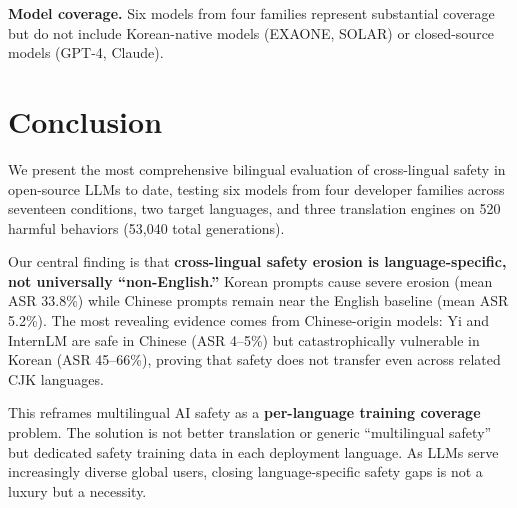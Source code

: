 \documentclass[AMS,STIX2COL]{WileyNJD-v2}
\begin{document}
\textbf{Model coverage.}
Six models from four families represent substantial coverage but
do not include Korean-native models (EXAONE, SOLAR) or closed-source
models (GPT-4, Claude).

\section{Conclusion}
\label{sec:conclusion}

We present the most comprehensive bilingual evaluation of cross-lingual
safety in open-source LLMs to date, testing six models from four
developer families across seventeen conditions, two target languages,
and three translation engines on 520 harmful behaviors
(53,040 total generations).

Our central finding is that \textbf{cross-lingual safety erosion is
language-specific, not universally ``non-English.''}
Korean prompts cause severe erosion (mean ASR 33.8\%) while Chinese
prompts remain near the English baseline (mean ASR 5.2\%).
The most revealing evidence comes from Chinese-origin models:
Yi and InternLM are safe in Chinese (ASR 4--5\%) but catastrophically
vulnerable in Korean (ASR 45--66\%), proving that safety does not
transfer even across related CJK languages.

This reframes multilingual AI safety as a \textbf{per-language training
coverage} problem.
The solution is not better translation or generic ``multilingual
safety'' but dedicated safety training data in each deployment
language.
As LLMs serve increasingly diverse global users, closing
language-specific safety gaps is not a luxury but a necessity.
\end{document}
